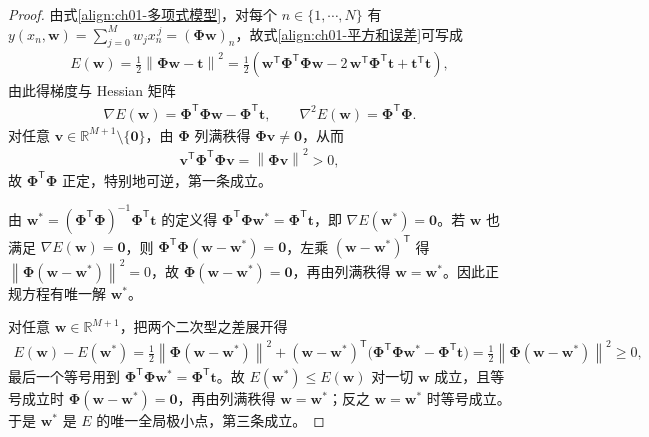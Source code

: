 \documentclass[../../main.tex]{subfiles}
\begin{document}
\begin{proof}
由式\eqref{align:ch01-多项式模型}，对每个 $n\in\{1,\cdots,N\}$ 有 $y(x_n,\mathbf{w})=\sum_{j=0}^{M}w_jx_n^{\,j}=(\boldsymbol{\Phi}\mathbf{w})_n$，故式\eqref{align:ch01-平方和误差}可写成
\begin{align*}
 E(\mathbf{w}) = \frac{1}{2}\left\|\boldsymbol{\Phi}\mathbf{w}-\mathbf{t}\right\|^{2}
 = \frac{1}{2}\left(\mathbf{w}^{\mathsf{T}}\boldsymbol{\Phi}^{\mathsf{T}}\boldsymbol{\Phi}\mathbf{w}
 - 2\,\mathbf{w}^{\mathsf{T}}\boldsymbol{\Phi}^{\mathsf{T}}\mathbf{t}
 + \mathbf{t}^{\mathsf{T}}\mathbf{t}\right),
\end{align*}
由此得梯度与 Hessian 矩阵
\begin{align*}
 \nabla E(\mathbf{w}) = \boldsymbol{\Phi}^{\mathsf{T}}\boldsymbol{\Phi}\mathbf{w} - \boldsymbol{\Phi}^{\mathsf{T}}\mathbf{t},
 \qquad
 \nabla^{2} E(\mathbf{w}) = \boldsymbol{\Phi}^{\mathsf{T}}\boldsymbol{\Phi}.
\end{align*}
对任意 $\mathbf{v}\in\mathbb{R}^{M+1}\setminus\{\mathbf{0}\}$，由 $\boldsymbol{\Phi}$ 列满秩得 $\boldsymbol{\Phi}\mathbf{v}\neq\mathbf{0}$，从而
\begin{align*}
 \mathbf{v}^{\mathsf{T}}\boldsymbol{\Phi}^{\mathsf{T}}\boldsymbol{\Phi}\mathbf{v} = \left\|\boldsymbol{\Phi}\mathbf{v}\right\|^{2} > 0,
\end{align*}
故 $\boldsymbol{\Phi}^{\mathsf{T}}\boldsymbol{\Phi}$ 正定，特别地可逆，第一条成立。

由 $\mathbf{w}^{*}=(\boldsymbol{\Phi}^{\mathsf{T}}\boldsymbol{\Phi})^{-1}\boldsymbol{\Phi}^{\mathsf{T}}\mathbf{t}$ 的定义得 $\boldsymbol{\Phi}^{\mathsf{T}}\boldsymbol{\Phi}\mathbf{w}^{*}=\boldsymbol{\Phi}^{\mathsf{T}}\mathbf{t}$，即 $\nabla E(\mathbf{w}^{*})=\mathbf{0}$。若 $\mathbf{w}$ 也满足 $\nabla E(\mathbf{w})=\mathbf{0}$，则 $\boldsymbol{\Phi}^{\mathsf{T}}\boldsymbol{\Phi}(\mathbf{w}-\mathbf{w}^{*})=\mathbf{0}$，左乘 $(\mathbf{w}-\mathbf{w}^{*})^{\mathsf{T}}$ 得 $\left\|\boldsymbol{\Phi}(\mathbf{w}-\mathbf{w}^{*})\right\|^{2}=0$，故 $\boldsymbol{\Phi}(\mathbf{w}-\mathbf{w}^{*})=\mathbf{0}$，再由列满秩得 $\mathbf{w}=\mathbf{w}^{*}$。因此正规方程有唯一解 $\mathbf{w}^{*}$。

对任意 $\mathbf{w}\in\mathbb{R}^{M+1}$，把两个二次型之差展开得
\begin{align*}
 E(\mathbf{w}) - E(\mathbf{w}^{*})
 = \frac{1}{2}\left\|\boldsymbol{\Phi}(\mathbf{w}-\mathbf{w}^{*})\right\|^{2}
 + (\mathbf{w}-\mathbf{w}^{*})^{\mathsf{T}}\bigl(\boldsymbol{\Phi}^{\mathsf{T}}\boldsymbol{\Phi}\mathbf{w}^{*}-\boldsymbol{\Phi}^{\mathsf{T}}\mathbf{t}\bigr)
 = \frac{1}{2}\left\|\boldsymbol{\Phi}(\mathbf{w}-\mathbf{w}^{*})\right\|^{2} \geqslant 0,
\end{align*}
最后一个等号用到 $\boldsymbol{\Phi}^{\mathsf{T}}\boldsymbol{\Phi}\mathbf{w}^{*}=\boldsymbol{\Phi}^{\mathsf{T}}\mathbf{t}$。故 $E(\mathbf{w}^{*})\leqslant E(\mathbf{w})$ 对一切 $\mathbf{w}$ 成立，且等号成立时 $\boldsymbol{\Phi}(\mathbf{w}-\mathbf{w}^{*})=\mathbf{0}$，再由列满秩得 $\mathbf{w}=\mathbf{w}^{*}$；反之 $\mathbf{w}=\mathbf{w}^{*}$ 时等号成立。于是 $\mathbf{w}^{*}$ 是 $E$ 的唯一全局极小点，第三条成立。
\end{proof}
\end{document}
